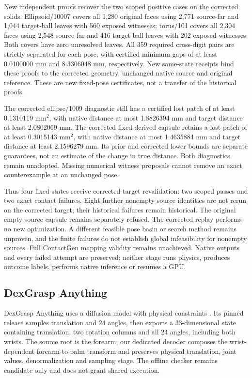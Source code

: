 \documentclass[10pt,letterpaper]{article}
\begin{document}
New independent proofs recover the two scoped positive cases on the corrected
solids. Ellipsoid/10007 covers all 1,280 original faces using 2,771 source-far and
1,044 target-ball leaves with 560 exposed witnesses; torus/101 covers all 2,304
faces using 2,548 source-far and 416 target-ball leaves with 202 exposed witnesses.
Both covers have zero unresolved leaves. All 359 required cross-digit pairs are
strictly separated for each pose, with certified minimum gaps of at least
0.0100000 mm and 8.3306048 mm, respectively. New same-state receipts bind these
proofs to the corrected geometry, unchanged native source and original reference.
These are new fixed-pose certificates, not a transfer of the historical proofs.

The corrected ellipse/1009 diagnostic still has a certified lost patch of at
least 0.1310119 $\mathrm{mm}^2$, with native distance at most 1.8826394 mm and
target distance at least 2.0802069 mm. The corrected fixed-derived capsule
retains a lost patch of at least 0.3015143 $\mathrm{mm}^2$, with native distance
at most 1.4635884 mm and target distance at least 2.1596279 mm. Its prior and
corrected lower bounds are separate guarantees, not an estimate of the change
in true distance. Both diagnostics remain unadopted. Missing numerical witness
proposals cannot remove an exact counterexample at an unchanged pose.

Thus four fixed states receive corrected-target revalidation: two scoped passes
and two exact contact failures. Eight further nonempty source identities are
not rerun on the corrected target; their historical failures remain historical.
The original empty-source capsule remains separately refused. The corrected
replay performs no new optimization. A different feasible pose basin or search
method remains unproven, and the finite failures do not establish global
infeasibility for nonempty sources. Full ContactGen mapping validity remains
unachieved. Native outputs and every failed attempt are preserved; neither
stage runs physics, produces outcome labels, performs native inference or
resumes a GPU.

\subsection{DexGrasp Anything}
DexGrasp Anything uses a diffusion model with physical constraints
\cite{dga}. Its pinned release samples translation and 24 angles, then exports
a 33-dimensional state containing translation, two rotation columns and all
24 angles, including both wrists. The source root is the forearm; our dedicated
decoder composes the wrist-dependent forearm-to-palm transform and preserves
physical translation, joint values, denormalization and sampling stage.
The offline checker remains candidate-only and does not grant shared execution.
\end{document}
